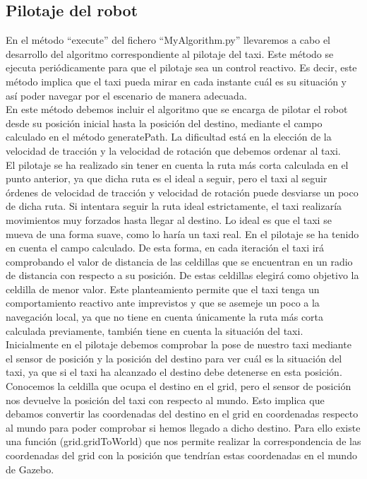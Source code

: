 \subsection{Pilotaje del robot}
En el método ``execute'' del fichero ``MyAlgorithm.py'' llevaremos a cabo el desarrollo del algoritmo correspondiente al pilotaje del taxi. Este método se ejecuta periódicamente para que el pilotaje sea un control reactivo. Es decir, este método implica que el taxi pueda mirar en cada instante cuál es su situación y así poder navegar por el escenario de manera adecuada.\\

En este método debemos incluir el algoritmo que se encarga de pilotar el robot desde su posición inicial hasta la posición del destino, mediante el campo calculado en el método generatePath. La dificultad está en la elección de la velocidad de tracción y la velocidad de rotación que debemos ordenar al taxi. \\

El pilotaje se ha realizado sin tener en cuenta la ruta más corta calculada en el punto anterior, ya que dicha ruta es el ideal a seguir, pero el taxi al seguir órdenes de velocidad de tracción y velocidad de rotación puede desviarse un poco de dicha ruta. Si intentara seguir la ruta ideal estrictamente, el taxi realizaría movimientos muy forzados hasta llegar al destino. Lo ideal es que el taxi se mueva de una forma suave, como lo haría un taxi real. En el pilotaje se ha tenido en cuenta el campo calculado. De esta forma, en cada iteración el taxi irá comprobando el valor de distancia de las celdillas que se encuentran en un radio de distancia con respecto a su posición. De estas celdillas elegirá como objetivo la celdilla de menor valor. Este planteamiento permite que el taxi tenga un comportamiento reactivo ante imprevistos y que se asemeje un poco a la navegación local, ya que no tiene en cuenta únicamente la ruta más corta calculada previamente, también tiene en cuenta la situación del taxi.\\

Inicialmente en el pilotaje debemos comprobar la pose de nuestro taxi mediante el sensor de posición y la posición del destino para ver cuál es la situación del taxi, ya que si el taxi ha alcanzado el destino debe detenerse en esta posición. Conocemos la celdilla que ocupa el destino en el grid, pero el sensor de posición nos devuelve la posición del taxi con respecto al mundo. Esto implica que debamos convertir las coordenadas del destino en el grid en coordenadas respecto al mundo para poder comprobar si hemos llegado a dicho destino. Para ello existe una función (grid.gridToWorld) que nos permite realizar la correspondencia de las coordenadas del grid con la posición que tendrían estas coordenadas en el mundo de Gazebo.\\

